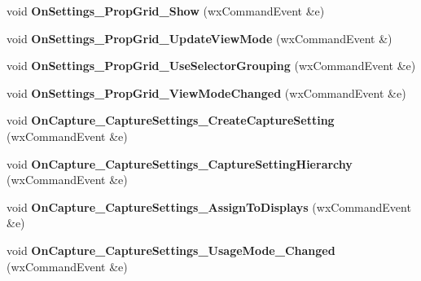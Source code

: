 \begin{DoxyCompactItemize}
\item 
\hypertarget{class_prop_view_frame_a961e3f23e8ad942ff5f7627cb241eb81}{void {\bfseries On\+Settings\+\_\+\+Prop\+Grid\+\_\+\+Show} (wx\+Command\+Event \&e)}\label{class_prop_view_frame_a961e3f23e8ad942ff5f7627cb241eb81}

\item 
\hypertarget{class_prop_view_frame_ae26d328585deeed5d5236c708f86ab86}{void {\bfseries On\+Settings\+\_\+\+Prop\+Grid\+\_\+\+Update\+View\+Mode} (wx\+Command\+Event \&)}\label{class_prop_view_frame_ae26d328585deeed5d5236c708f86ab86}

\item 
\hypertarget{class_prop_view_frame_a4f186e68e28dbfd3a9b4c259b6e8728b}{void {\bfseries On\+Settings\+\_\+\+Prop\+Grid\+\_\+\+Use\+Selector\+Grouping} (wx\+Command\+Event \&e)}\label{class_prop_view_frame_a4f186e68e28dbfd3a9b4c259b6e8728b}

\item 
\hypertarget{class_prop_view_frame_a22ab91fbf6438dd0534edba30af1837c}{void {\bfseries On\+Settings\+\_\+\+Prop\+Grid\+\_\+\+View\+Mode\+Changed} (wx\+Command\+Event \&e)}\label{class_prop_view_frame_a22ab91fbf6438dd0534edba30af1837c}

\item 
\hypertarget{class_prop_view_frame_adb080f720743e568c15afbe8e4cd4ae0}{void {\bfseries On\+Capture\+\_\+\+Capture\+Settings\+\_\+\+Create\+Capture\+Setting} (wx\+Command\+Event \&e)}\label{class_prop_view_frame_adb080f720743e568c15afbe8e4cd4ae0}

\item 
\hypertarget{class_prop_view_frame_aa4a8090688e540d8e50740d19e704c55}{void {\bfseries On\+Capture\+\_\+\+Capture\+Settings\+\_\+\+Capture\+Setting\+Hierarchy} (wx\+Command\+Event \&e)}\label{class_prop_view_frame_aa4a8090688e540d8e50740d19e704c55}

\item 
\hypertarget{class_prop_view_frame_a07447bc62deedbde04d543887cf30be1}{void {\bfseries On\+Capture\+\_\+\+Capture\+Settings\+\_\+\+Assign\+To\+Displays} (wx\+Command\+Event \&e)}\label{class_prop_view_frame_a07447bc62deedbde04d543887cf30be1}

\item 
\hypertarget{class_prop_view_frame_a29f1dac0f7986f859f114277197a3fb0}{void {\bfseries On\+Capture\+\_\+\+Capture\+Settings\+\_\+\+Usage\+Mode\+\_\+\+Changed} (wx\+Command\+Event \&e)}\label{class_prop_view_frame_a29f1dac0f7986f859f114277197a3fb0}


\end{DoxyCompactItemize}
